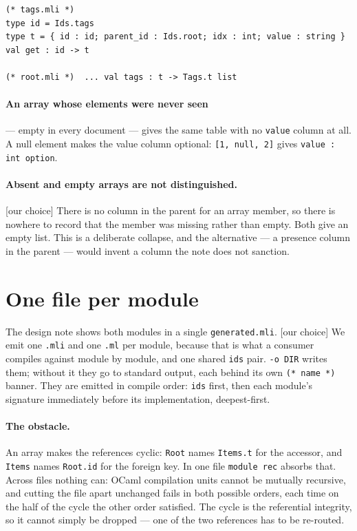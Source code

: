 \documentclass[11pt,a4paper]{article}
\newcommand{\ourcall}{\textcolor{ours}{\textsf{[our choice]}}}
\begin{document}
\begin{lstlisting}[style=ml]
(* tags.mli *)
type id = Ids.tags
type t = { id : id; parent_id : Ids.root; idx : int; value : string }
val get : id -> t

(* root.mli *)  ... val tags : t -> Tags.t list
\end{lstlisting}

\paragraph{An array whose elements were never seen} --- empty in every
document --- gives the same table with no \texttt{value} column at all. A null
element makes the value column optional: \texttt{[1, null, 2]} gives
\texttt{value : int option}.

\paragraph{Absent and empty arrays are not distinguished.} \ourcall{} There is
no column in the parent for an array member, so there is nowhere to record
that the member was missing rather than empty. Both give an empty list. This
is a deliberate collapse, and the alternative --- a presence column in the
parent --- would invent a column the note does not sanction.

\section{One file per module}\label{sec:units}

The design note shows both modules in a single \texttt{generated.mli}.
\ourcall{} We emit one \texttt{.mli} and one \texttt{.ml} per module, because
that is what a consumer compiles against module by module, and one shared
\texttt{ids} pair. \texttt{-o DIR} writes them; without it they go to standard
output, each behind its own \texttt{(* name *)} banner. They are emitted in
compile order: \texttt{ids} first, then each module's signature immediately
before its implementation, deepest-first.

\paragraph{The obstacle.} An array makes the references cyclic:
\texttt{Root} names \texttt{Items.t} for the accessor, and \texttt{Items}
names \texttt{Root.id} for the foreign key. In one file \texttt{module rec}
absorbs that. Across files nothing can: OCaml compilation units cannot be
mutually recursive, and cutting the file apart unchanged fails in both
possible orders, each time on the half of the cycle the other order
satisfied. The cycle is the referential integrity, so it cannot simply be
dropped --- one of the two references has to be re-routed.
\end{document}
